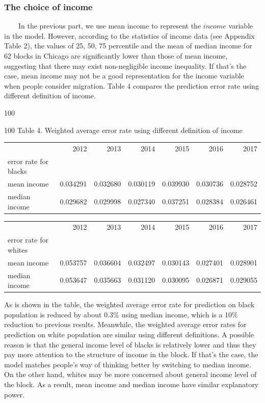 \documentclass{article}
\begin{document}
\subsubsection{The choice of income}
\ \ \ \ In the previous part, we use mean income to represent the $income$ variable in the model. However, according to the statistics of income data (see Appendix Table 2), the values of 25, 50, 75 percentile and the mean of median income for 62 blocks in Chicago are significantly lower than those of mean income, suggesting that there may exist non-negligible income inequality. If that's the case, mean income may not be a good representation for the income variable when people consider migration. Table 4 compares the prediction error rate using different definition of income.
\par {\color{white} 100}
\par \centerline{{\color{white} 100} Table 4. Weighted average error rate using different definition of income}
\begin{table}[!h]
\begin{tabular}{lrrrrrr}
\toprule
{} &      2012 &      2013 &      2014 &      2015 &      2016 &      2017 \\
error rate for blacks &           &           &           &           &           &           \\
\midrule
mean income      &  0.034291 &  0.032680 &  0.030119 &  0.039930 &  0.030736 &  0.028752 \\
median income      &  0.029682 &  0.029998 &  0.027340 &  0.037251 &  0.028384 &  0.026461 \\
\bottomrule
\end{tabular}
\begin{tabular}{lrrrrrr}
\toprule
{} &      2012 &      2013 &      2014 &      2015 &      2016 &      2017 \\
error rate for whites &           &           &           &           &           &           \\
\midrule
mean income      &  0.053757 &  0.036604 &  0.032497 &  0.030143 &  0.027401 &  0.028901 \\
median income      &  0.053647 &  0.035663 &  0.031120 &  0.030095 &  0.026871 &  0.029055 \\
\bottomrule
\end{tabular}
\end{table}
\par As is shown in the table, the weighted average error rate for prediction on black population is reduced by about 0.3\% using median income, which is a 10\% reduction to previous results. Meanwhile, the weighted average error rates for prediction on white population are similar using different definitions. A possible reason is that the general income level of blacks is relatively lower and thus they pay more attention to the structure of income in the block. If that's the case, the model matches people's way of thinking better by switching to median income. On the other hand, whites may be more concerned about general income level of the block. As a result, mean income and median income have similar explanatory power.
\end{document}
